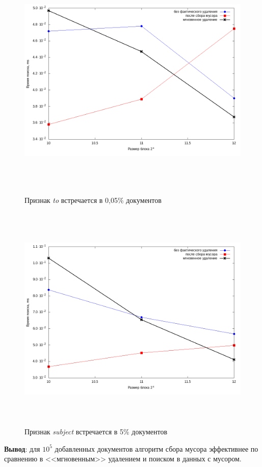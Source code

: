 \begin{figure}[H]
\includegraphics[width=\linewidth, height=11cm]{fig/limit_1/1e5/to.png}
\caption{Признак \textit{to} встречается в 0,05\% документов}
\includegraphics[width=\linewidth, height=11cm]{fig/limit_1/1e5/subject.png}
\caption{Признак \textit{subject} встречается в 5\% документов}
\end{figure}


\textbf{Вывод}: для $10^5$ добавленных документов алгоритм сбора мусора эффективнее
по сравнению в <<мгновенным>> удалением и поиском в данных с мусором.

